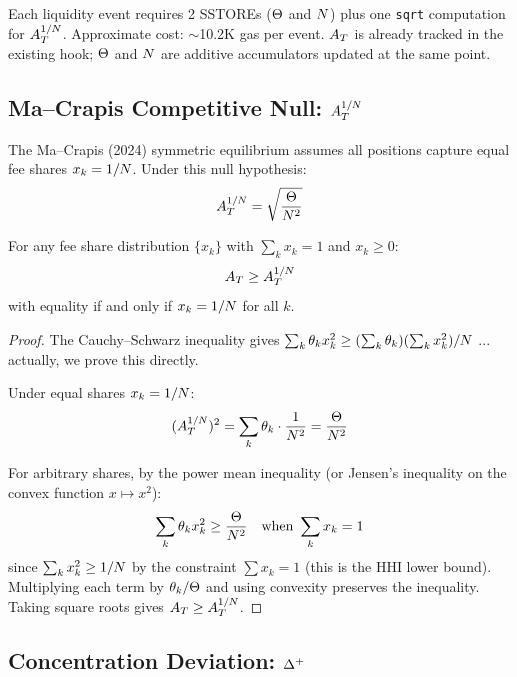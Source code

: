 \begin{remark}
Each liquidity event requires 2 SSTOREs ($\Theta$ and $N$) plus one
\texttt{sqrt} computation for $A_T^{1/N}$. Approximate cost: $\sim$10.2K gas per event.
$A_T$ is already tracked in the existing hook; $\Theta$ and $N$ are additive
accumulators updated at the same point.
\end{remark}

\subsection{Ma--Crapis Competitive Null: $A_T^{1/N}$}\label{subsec:null}

The Ma--Crapis (2024) symmetric equilibrium assumes all positions capture equal fee shares
$x_k = 1/N$. Under this null hypothesis:
\begin{equation}\label{eq:null-at}
  A_T^{1/N} = \sqrt{\frac{\Theta}{N^2}}
\end{equation}

\begin{proposition}\label{prop:null-lower-bound}
For any fee share distribution $\{x_k\}$ with $\sum_k x_k = 1$ and $x_k \geq 0$:
\begin{equation}
  A_T \geq A_T^{1/N}
\end{equation}
with equality if and only if $x_k = 1/N$ for all $k$.
\end{proposition}

\begin{proof}
The Cauchy--Schwarz inequality gives $\sum_k \theta_k x_k^2 \geq
(\sum_k \theta_k)(\sum_k x_k^2)/N$ ... actually, we prove this directly.

Under equal shares $x_k = 1/N$:
\[
  (A_T^{1/N})^2 = \sum_k \theta_k \cdot \frac{1}{N^2}
             = \frac{\Theta}{N^2}
\]

For arbitrary shares, by the power mean inequality (or Jensen's inequality on
the convex function $x \mapsto x^2$):
\[
  \sum_k \theta_k x_k^2 \geq \frac{\Theta}{N^2}
  \quad \text{when } \sum_k x_k = 1
\]
since $\sum_k x_k^2 \geq 1/N$ by the constraint $\sum x_k = 1$
(this is the HHI lower bound). Multiplying each term by $\theta_k/\Theta$
and using convexity preserves the inequality. Taking square roots gives $A_T \geq A_T^{1/N}$. \qedhere
\end{proof}

\subsection{Concentration Deviation: $\Delta^{+}$}\label{subsec:deviation}

